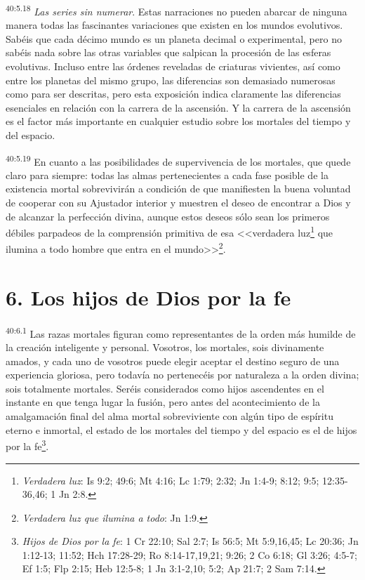 \par
\textsuperscript{40:5.18} \textit{Las series sin numerar}. Estas narraciones no pueden abarcar de ninguna manera todas las fascinantes variaciones que existen en los mundos evolutivos. Sabéis que cada décimo mundo es un planeta decimal o experimental, pero no sabéis nada sobre las otras variables que salpican la procesión de las esferas evolutivas. Incluso entre las órdenes reveladas de criaturas vivientes, así como entre los planetas del mismo grupo, las diferencias son demasiado numerosas como para ser descritas, pero esta exposición indica claramente las diferencias esenciales en relación con la carrera de la ascensión. Y la carrera de la ascensión es el factor más importante en cualquier estudio sobre los mortales del tiempo y del espacio.

\par
\textsuperscript{40:5.19} En cuanto a las posibilidades de supervivencia de los mortales, que quede claro para siempre: todas las almas pertenecientes a cada fase posible de la existencia mortal sobrevivirán a condición de que manifiesten la buena voluntad de cooperar con su Ajustador interior y muestren el deseo de encontrar a Dios y de alcanzar la perfección divina, aunque estos deseos sólo sean los primeros débiles parpadeos de la comprensión primitiva de esa <<verdadera luz\footnote{\textit{Verdadera luz}: Is 9:2; 49:6; Mt 4:16; Lc 1:79; 2:32; Jn 1:4-9; 8:12; 9:5; 12:35-36,46; 1 Jn 2:8.} que ilumina a todo hombre que entra en el mundo>>\footnote{\textit{Verdadera luz que ilumina a todo}: Jn 1:9.}.

\section*{6. Los hijos de Dios por la fe}
\par
\textsuperscript{40:6.1} Las razas mortales figuran como representantes de la orden más humilde de la creación inteligente y personal. Vosotros, los mortales, sois divinamente amados, y cada uno de vosotros puede elegir aceptar el destino seguro de una experiencia gloriosa, pero todavía no pertenecéis por naturaleza a la orden divina; sois totalmente mortales. Seréis considerados como hijos ascendentes en el instante en que tenga lugar la fusión, pero antes del acontecimiento de la amalgamación final del alma mortal sobreviviente con algún tipo de espíritu eterno e inmortal, el estado de los mortales del tiempo y del espacio es el de hijos por la fe\footnote{\textit{Hijos de Dios por la fe}: 1 Cr 22:10; Sal 2:7; Is 56:5; Mt 5:9,16,45; Lc 20:36; Jn 1:12-13; 11:52; Hch 17:28-29; Ro 8:14-17,19,21; 9:26; 2 Co 6:18; Gl 3:26; 4:5-7; Ef 1:5; Flp 2:15; Heb 12:5-8; 1 Jn 3:1-2,10; 5:2; Ap 21:7; 2 Sam 7:14.}.

